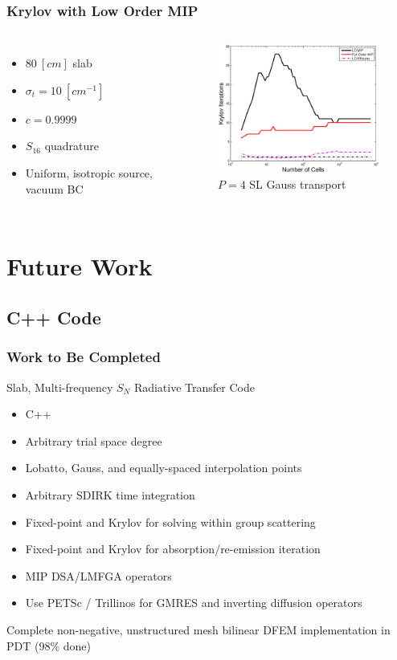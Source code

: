 \documentclass{beamer}
\newif\ifplacelogo %
\begin{document}
\begin{frame}
\frametitle{Krylov with Low Order MIP}
\begin{columns}[c]
\begin{itemize}
\item $80~[cm]$ slab
\item $\sigma_t = 10~[cm^{-1}]$
\item $c=0.9999$
\item $S_{16}$ quadrature
\item Uniform, isotropic source, vacuum BC
\end{itemize}
\begin{figure}
\includegraphics[width=7cm]{Krylov_Comp_p4_sl_Gauss.eps}
\caption{$P=4$ SL Gauss transport}
\end{figure}
\end{columns}
\end{frame}

\placelogotrue

\section{Future Work}
\subsection{C++ Code}
\begin{frame}
\frametitle{Work to Be Completed}
Slab, Multi-frequency $S_N$ Radiative Transfer Code
\begin{itemize}
\item C++
\item Arbitrary trial space degree
\item Lobatto, Gauss, and equally-spaced interpolation points
\item Arbitrary SDIRK time integration
\item Fixed-point and Krylov for solving within group scattering 
\item Fixed-point and Krylov for absorption/re-emission iteration
\item MIP DSA/LMFGA operators
\item Use PETSc / Trillinos for GMRES and inverting diffusion operators
\end{itemize} 
Complete non-negative, unstructured mesh bilinear DFEM implementation in PDT (98\% done)
\end{frame}
\end{document}
